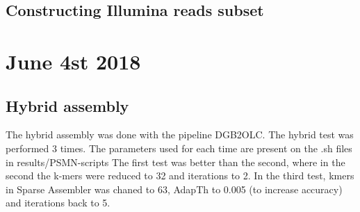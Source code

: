\documentclass[10pt,a4paper]{article}
\begin{document}
\subsection{Constructing Illumina reads subset}


\section{June 4st 2018}

\subsection{Hybrid assembly}

The hybrid assembly was done with the pipeline DGB2OLC. The hybrid test was performed 3 times. The parameters used for each time are present on the .sh files in results/PSMN-scripts
The first test was better than the second, where in the second the k-mers were reduced to 32 and iterations to 2. In the third test, kmers in Sparse Assembler was chaned to 63, AdapTh to 0.005 (to increase accuracy) and iterations back to 5. 
\end{document}
